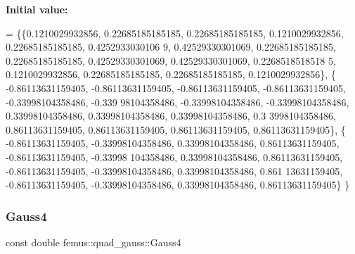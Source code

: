 {\bfseries Initial value\+:}
\begin{DoxyCode}
= \{\{0.1210029932856, 0.22685185185185, 0.22685185185185, 0.1210029932856, 0.22685185185185, 0.4252933030106
      9, 0.42529330301069, 0.22685185185185, 0.22685185185185, 0.42529330301069, 0.42529330301069, 0.2268518518518
      5, 0.1210029932856, 0.22685185185185, 0.22685185185185, 0.1210029932856\},
    \{ -0.86113631159405, -0.86113631159405, -0.86113631159405, -0.86113631159405, -0.33998104358486, -0.339
      98104358486, -0.33998104358486, -0.33998104358486, 0.33998104358486, 0.33998104358486, 0.33998104358486, 0.3
      3998104358486, 0.86113631159405, 0.86113631159405, 0.86113631159405, 0.86113631159405\},
    \{ -0.86113631159405, -0.33998104358486, 0.33998104358486, 0.86113631159405, -0.86113631159405, -0.33998
      104358486, 0.33998104358486, 0.86113631159405, -0.86113631159405, -0.33998104358486, 0.33998104358486, 0.861
      13631159405, -0.86113631159405, -0.33998104358486, 0.33998104358486, 0.86113631159405\}
  \}
\end{DoxyCode}
\mbox{\label{classfemus_1_1quad__gauss_a999c35e1333bb5f0c307fe4f5fc13633}} 
\subsubsection{\texorpdfstring{Gauss4}{Gauss4}}
{\footnotesize\ttfamily const double femus\+::quad\+\_\+gauss\+::\+Gauss4\hspace{0.3cm}{\ttfamily [static]}}

